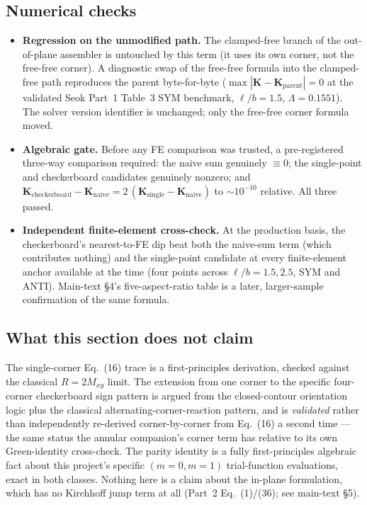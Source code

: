 \documentclass[11pt]{article}
\begin{document}
\subsection{Numerical checks}\label{sec:sm-checks}
\begin{itemize}\itemsep2pt
\item \textbf{Regression on the unmodified path.} The clamped-free branch
of the out-of-plane assembler is untouched by this term (it uses its own
corner, not the free-free corner). A diagnostic swap of the free-free
formula into the clamped-free path reproduces the parent
byte-for-byte ($\max|\mathbf{K}-\mathbf{K}_{\mathrm{parent}}|=0$ at the
validated Seok Part~1 Table~3 SYM benchmark, $\ell/b=1.5$,
$\Lambda=0.1551$). The
solver version identifier is unchanged; only the free-free corner
formula moved.
\item \textbf{Algebraic gate.} Before any FE comparison was trusted, a
pre-registered three-way comparison required: the naive sum genuinely
$\equiv 0$; the single-point and checkerboard candidates genuinely
nonzero; and
$\mathbf{K}_{\mathrm{checkerboard}}-\mathbf{K}_{\mathrm{naive}}
=2\,(\mathbf{K}_{\mathrm{single}}-\mathbf{K}_{\mathrm{naive}})$
to ${\sim}10^{-10}$ relative. All three passed.
\item \textbf{Independent finite-element cross-check.} At the production
basis, the checkerboard's nearest-to-FE dip beat both the naive-sum term
(which contributes nothing) and the single-point candidate at every
finite-element anchor available at the time (four points across
$\ell/b=1.5,2.5$, SYM and ANTI). Main-text \S4's five-aspect-ratio
table is a later, larger-sample confirmation of the same formula.
\end{itemize}

\subsection{What this section does not claim}\label{sec:sm-limits}
The single-corner Eq.~(16) trace is a first-principles derivation,
checked against the classical $R=2M_{xy}$ limit. The extension from one
corner to the specific four-corner checkerboard sign pattern is argued
from the closed-contour orientation logic plus the classical
alternating-corner-reaction pattern, and is \emph{validated} rather than
independently re-derived corner-by-corner from Eq.~(16) a second time ---
the same status the annular companion's corner term has relative to its
own Green-identity cross-check. The parity identity is a fully
first-principles algebraic fact about this project's specific
$(m=0,m=1)$ trial-function evaluations, exact in both classes. Nothing
here is a claim about the in-plane formulation, which has no Kirchhoff
jump term at all (Part~2 Eq.~(1)/(36); see main-text \S5).
\end{document}
